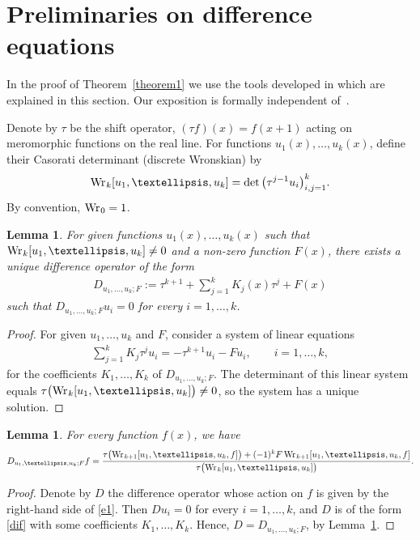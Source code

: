 \documentclass[11pt]{article}
\numberwithin{equation}{section}
\newtheorem{lem}[thm]{Lemma}
 { \theoremstyle{definition}
\newtheorem{Remark}[thm]{Remark} }
\def\lc{,\allowbreak\ldots,\allowbreak}
\def\Wr{\mathop{\mathrm{Wr\vrule height0pt width.6pt}}\nolimits}
\begin{document}
\section{Preliminaries on difference equations}\label{section4}

In the proof of Theorem~\ref{theorem1} we use the tools developed in \cite{MTV} which are explained in this section. Our exposition is formally independent of~\cite{MTV}.

Denote by $\tau$ be the shift operator, $(\tau f)(x)=f(x+1)$ acting on meromorphic functions on the real line. For functions $u_1(x)\lc u_k(x)$, define their Casorati determinant (discrete Wronskian) by
\begin{gather*}
\Wr_k[u_1\lc u_k] = \det\big(\tau^{j-1}u_i\big)_{i,j=1}^k.
\end{gather*}
By convention, $\Wr_0=1$.
\begin{lem}\label{L1}
For given functions $u_1(x)\lc u_k(x)$ such that $\Wr_k[u_1\lc u_k]\ne 0$ and a non-zero function $F(x)$, there exists a unique difference operator of the form
\begin{gather}\label{dif}
D_{u_1\lc u_k;F}:=\tau^{k+1}+\sum_{j=1}^k K_j(x)\tau^j+F(x)
\end{gather}
such that $D_{u_1\lc u_k;F}u_i=0$ for every $i=1\lc k$.
\end{lem}

\begin{proof} For given $u_1\lc u_k$ and $F$, consider a system of linear equations
\begin{gather*}
\sum_{j=1}^kK_j \tau^ju_i=-\tau^{k+1}u_i-Fu_i,\qquad i=1\lc k,
\end{gather*}
for the coefficients $K_1\lc K_k$ of $D_{u_1\lc u_k;F}$. The determinant of this linear system equals $\tau\bigl(\Wr_k[u_1\lc u_k]\bigr)\ne 0$, so the system has a unique solution.
\end{proof}

\begin{lem}\label{L2}
For every function $f(x)$, we have
\begin{gather}
D_{u_1\lc u_k; F} f = \frac{\tau\bigl(\Wr_{k+1}[u_1\lc u_k,f]\bigr)+ (-1)^kF\Wr_{k+1}[u_1\lc u_k,f]}{\tau\bigl(\Wr_k[u_1\lc u_k]\bigr)}.\label{e1}
\end{gather}
\end{lem}

\begin{proof} Denote by $D$ the difference operator whose action on $f$ is given by the right-hand side of \eqref{e1}. Then $Du_i=0$ for every $i=1\lc k$, and $D$ is of the form \eqref{dif} with some coefficients $K_1\lc K_k$. Hence, $D=D_{u_1\lc u_k; F}$, by Lemma~\ref{L1}.
\end{proof}
\end{document}
